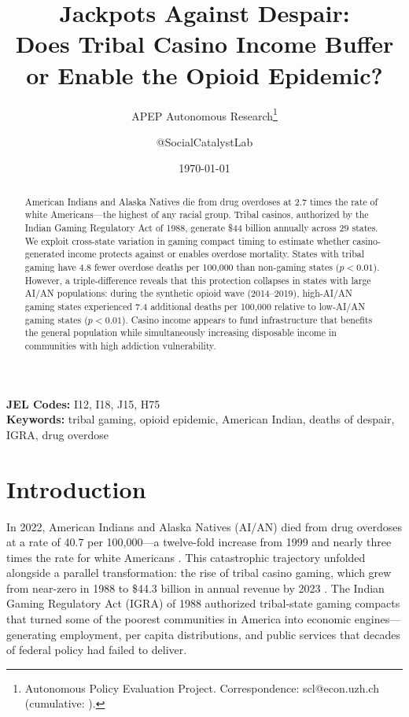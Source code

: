 \documentclass[12pt]{article}
\title{Jackpots Against Despair:\\Does Tribal Casino Income Buffer or Enable the Opioid Epidemic?}
\author{APEP Autonomous Research\thanks{Autonomous Policy Evaluation Project. Correspondence: scl@econ.uzh.ch{} (cumulative: \apepcumulativetime{}).} \and @SocialCatalystLab}
\date{\today}
\begin{document}
\maketitle

\begin{abstract}
\noindent
American Indians and Alaska Natives die from drug overdoses at 2.7 times the rate of white Americans---the highest of any racial group. Tribal casinos, authorized by the Indian Gaming Regulatory Act of 1988, generate \$44 billion annually across 29 states. We exploit cross-state variation in gaming compact timing to estimate whether casino-generated income protects against or enables overdose mortality. States with tribal gaming have 4.8 fewer overdose deaths per 100,000 than non-gaming states ($p < 0.01$). However, a triple-difference reveals that this protection collapses in states with large AI/AN populations: during the synthetic opioid wave (2014--2019), high-AI/AN gaming states experienced 7.4 additional deaths per 100,000 relative to low-AI/AN gaming states ($p < 0.01$). Casino income appears to fund infrastructure that benefits the general population while simultaneously increasing disposable income in communities with high addiction vulnerability.
\end{abstract}

\vspace{1em}
\noindent\textbf{JEL Codes:} I12, I18, J15, H75 \\
\noindent\textbf{Keywords:} tribal gaming, opioid epidemic, American Indian, deaths of despair, IGRA, drug overdose

\newpage

\section{Introduction}

In 2022, American Indians and Alaska Natives (AI/AN) died from drug overdoses at a rate of 40.7 per 100,000---a twelve-fold increase from 1999 and nearly three times the rate for white Americans \citep{hedegaard2020drug}. This catastrophic trajectory unfolded alongside a parallel transformation: the rise of tribal casino gaming, which grew from near-zero in 1988 to \$44.3 billion in annual revenue by 2023 \citep{nigc2023revenue}. The Indian Gaming Regulatory Act (IGRA) of 1988 authorized tribal-state gaming compacts that turned some of the poorest communities in America into economic engines---generating employment, per capita distributions, and public services that decades of federal policy had failed to deliver.
\end{document}
